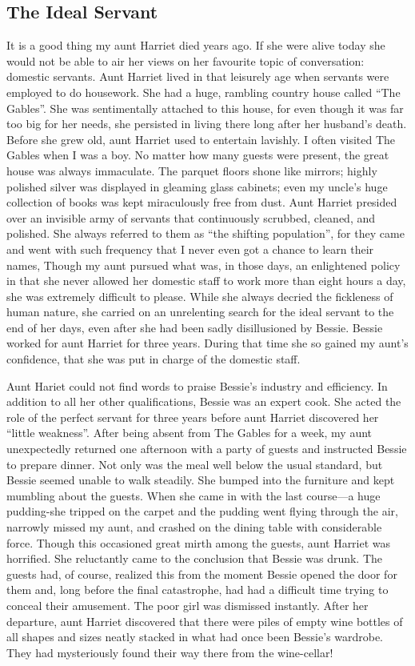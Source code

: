 \documentclass[11pt]{article}
\begin{document}
\subsection{The Ideal Servant}
\label{sec-1-49}

It is a good thing my aunt Harriet died years ago. If she were alive today she would not be able to air her views on her favourite topic of conversation: domestic servants. Aunt Harriet lived in that leisurely age when servants were employed to do housework. She had a huge, rambling country house called ``The Gables''. She was sentimentally attached to this house, for even though it was far too big for her needs, she persisted in living there long after her husband's death. Before she grew old, aunt Harriet used to entertain lavishly. I often visited The Gables when I was a boy. No matter how many guests were present, the great house was always immaculate. The parquet floors shone like mirrors; highly polished silver was displayed in gleaming glass cabinets; even my uncle's huge collection of books was kept miraculously free from dust. Aunt Harriet presided over an invisible army of servants that continuously scrubbed, cleaned, and polished. She always referred to them as ``the shifting population'', for they came and went with such frequency that I never even got a chance to learn their names, Though my aunt pursued what was, in those days, an enlightened policy in that she never allowed her domestic staff to work more than eight hours a day, she was extremely difficult to please. While she always decried the fickleness of human nature, she carried on an unrelenting search for the ideal servant to the end of her days, even after she had been sadly disillusioned by Bessie. Bessie worked for aunt Harriet for three years. During that time she so gained my aunt's confidence, that she was put in charge of the domestic staff.

Aunt Hariet could not find words to praise Bessie's industry and efficiency. In addition to all her other qualifications, Bessie was an expert cook. She acted the role of the perfect servant for three years before aunt Harriet discovered her ``little weakness''. After being absent from The Gables for a week, my aunt unexpectedly returned one afternoon with a party of guests and instructed Bessie to prepare dinner. Not only was the meal well below the usual standard, but Bessie seemed unable to walk steadily. She bumped into the furniture and kept mumbling about the guests. When she came in with the last course—a huge pudding-she tripped on the carpet and the pudding went flying through the air, narrowly missed my aunt, and crashed on the dining table with considerable force. Though this occasioned great mirth among the guests, aunt Harriet was horrified. She reluctantly came to the conclusion that Bessie was drunk. The guests had, of course, realized this from the moment Bessie opened the door for them and, long before the final catastrophe, had had a difficult time trying to conceal their amusement. The poor girl was dismissed instantly. After her departure, aunt Harriet discovered that there were piles of empty wine bottles of all shapes and sizes neatly stacked in what had once been Bessie's wardrobe. They had mysteriously found their way there from the wine-cellar! 
\end{document}
